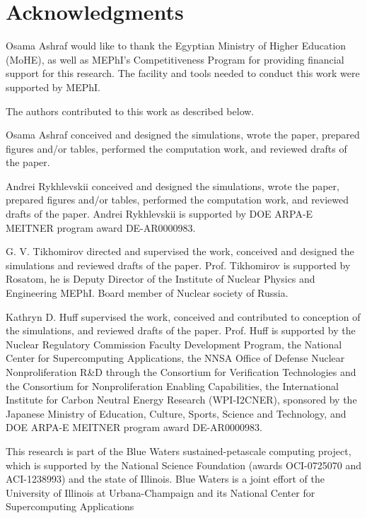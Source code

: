 \section{Acknowledgments}

Osama Ashraf would like to thank the Egyptian Ministry of Higher Education (MoHE), as well as MEPhI's Competitiveness Program for providing financial support for this research. The facility and tools needed to conduct this work were supported by MEPhI.

The authors contributed to this work as described below.

Osama Ashraf conceived and designed the simulations, wrote the paper, prepared figures 
and/or tables, performed the computation work, and reviewed drafts of the paper.

Andrei Rykhlevskii conceived and designed the simulations, wrote the paper, prepared figures 
and/or tables, performed the computation work, and reviewed drafts of the paper. Andrei Rykhlevskii 
is supported by  DOE ARPA-E MEITNER program award DE-AR0000983. 

G. V. Tikhomirov directed and supervised the work, conceived and designed the simulations and reviewed drafts of the paper. Prof. Tikhomirov is supported by Rosatom, he is Deputy Director of the Institute of Nuclear Physics and Engineering MEPhI. Board member of Nuclear society of Russia.

Kathryn D. Huff supervised the work, conceived and contributed to conception of the simulations, and reviewed drafts of the paper.  Prof. Huff is supported by the Nuclear Regulatory Commission Faculty Development Program, the National Center for Supercomputing Applications, the NNSA Office of Defense Nuclear Nonproliferation R\&D through the Consortium for Verification Technologies and the Consortium for Nonproliferation Enabling Capabilities,  the International Institute for Carbon Neutral Energy Research (WPI-I2CNER), 
sponsored by the Japanese Ministry of Education, Culture, Sports, Science and Technology, and  DOE ARPA-E MEITNER program award DE-AR0000983.

This research is part of the Blue Waters sustained-petascale computing project, 
which is supported by the National Science Foundation (awards OCI-0725070 and 
ACI-1238993) and the state of Illinois. Blue Waters is a joint effort of the 
University of Illinois at Urbana-Champaign and its National Center for 
Supercomputing Applications 
